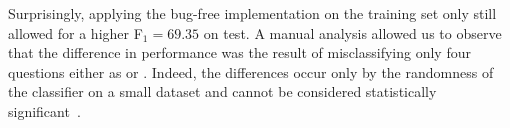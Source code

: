 Surprisingly, applying the bug-free implementation on the training set only 
still allowed for a higher F$_1 =69.35$ on test.
A manual analysis allowed us to observe that the difference in performance was 
the result of misclassifying only four questions either as \yes or \unsure. 
Indeed, the differences occur only by the randomness of the classifier on 
a small dataset and cannot be considered statistically 
significant~\cite{Marquez-EtAl:2015:SemEval}. 

